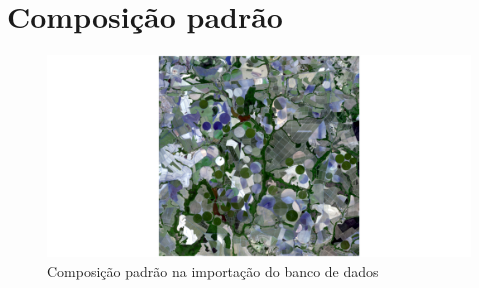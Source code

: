 \documentclass[a4paper]{article}
\begin{document}
	
	\section{Composição padrão}
	\begin{figure}[ht!]
		\hspace{-7.5cm}\includegraphics[width=1.9\linewidth]{../images/default}
		\caption{Composição padrão na importação do banco de dados}
	\end{figure}
\end{document}
